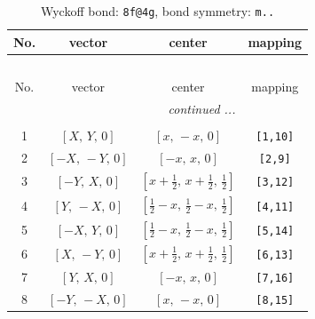 \documentclass[fleqn,8pt]{jsarticle}
\begin{document}
\begin{longtable}{cccc}
\caption{Wyckoff bond: {\tt 8f@4g}, bond symmetry: {\tt m..}}
 \\
 \hline \hline
No. & vector & center & mapping \\ \hline \endfirsthead

\multicolumn{3}{l}{\tablename\ \thetable{}} \\
 \hline \hline
No. & vector & center & mapping \\ \hline \endhead

 \hline \hline
\multicolumn{3}{r}{\footnotesize\it continued ...} \\ \endfoot

 \hline \hline
\multicolumn{3}{r}{} \\ \endlastfoot

1 & $\left[ X,\, Y,\, 0 \right]$ & $\left[ x,\, - x,\, 0 \right]$ & {\tt [1,10]} \\ \hline
2 & $\left[ - X,\, - Y,\, 0 \right]$ & $\left[ - x,\, x,\, 0 \right]$ & {\tt [2,9]} \\ \hline
3 & $\left[ - Y,\, X,\, 0 \right]$ & $\left[ x + \frac{1}{2},\, x + \frac{1}{2},\, \frac{1}{2} \right]$ & {\tt [3,12]} \\ \hline
4 & $\left[ Y,\, - X,\, 0 \right]$ & $\left[ \frac{1}{2} - x,\, \frac{1}{2} - x,\, \frac{1}{2} \right]$ & {\tt [4,11]} \\ \hline
5 & $\left[ - X,\, Y,\, 0 \right]$ & $\left[ \frac{1}{2} - x,\, \frac{1}{2} - x,\, \frac{1}{2} \right]$ & {\tt [5,14]} \\ \hline
6 & $\left[ X,\, - Y,\, 0 \right]$ & $\left[ x + \frac{1}{2},\, x + \frac{1}{2},\, \frac{1}{2} \right]$ & {\tt [6,13]} \\ \hline
7 & $\left[ Y,\, X,\, 0 \right]$ & $\left[ - x,\, x,\, 0 \right]$ & {\tt [7,16]} \\ \hline
8 & $\left[ - Y,\, - X,\, 0 \right]$ & $\left[ x,\, - x,\, 0 \right]$ & {\tt [8,15]} \\
\end{longtable}
\renewcommand{\arraystretch}{1.2}
\end{document}
